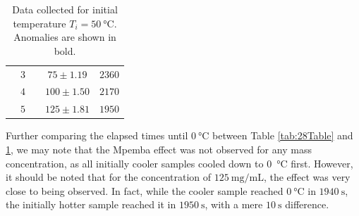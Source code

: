 \documentclass[../main.tex]{subfiles}
\begin{document}
\begin{table}[H]
{\begin{tabular}{@{}ccccc@{}}
                                                                                                & $3$                                                                                               &                                                                                                & $75 \pm 1.19$                                                                                                        & $2360$                                                                                                              \\
                                                                                                & $4$                                                                                               &                                                                                                & $100 \pm 1.50$                                                                                                       & $2170$                                                                                                              \\
                                                                                                & $5$                                                                                               &                                                                                                & $125 \pm 1.81$                                                                                                       & $1950$                                                                                                         \\ \bottomrule
\end{tabular}%
}
\caption{Data collected for initial temperature $T_i = \SI{50}{\celsius}$. Anomalies are shown in bold.}
\label{tab:50Table}
\end{table}

Further comparing the elapsed times until $\SI{0}{\celsius}$ between Table \ref{tab:28Table} and \ref{tab:50Table}, we may note that the Mpemba effect was not observed for any mass concentration, as all initially cooler samples cooled down to \SI{0}{\celsius} first. However, it should be noted that for the concentration of $\SI{125}{\milli\gram\per\milli\liter}$, the effect was very close to being observed. In fact, while the cooler sample reached $\SI{0}{\celsius}$ in $\SI{1940}{\second}$, the initially hotter sample reached it in $\SI{1950}{\second}$, with a mere $\SI{10}{\second}$ difference. \par
\end{document}
